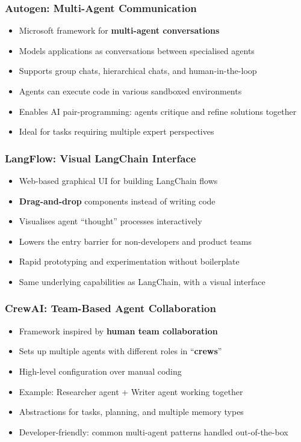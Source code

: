 \begin{frame}[fragile]\frametitle{Autogen: Multi-Agent Communication}
      \begin{itemize}
	  \item Microsoft framework for \textbf{multi-agent conversations}
	  \item Models applications as conversations between specialised agents
	  \item Supports group chats, hierarchical chats, and human-in-the-loop
	  \item Agents can execute code in various sandboxed environments
	  \item Enables AI pair-programming: agents critique and refine solutions together
	  \item Ideal for tasks requiring multiple expert perspectives
	  \end{itemize}
\end{frame}

\begin{frame}[fragile]\frametitle{LangFlow: Visual LangChain Interface}
      \begin{itemize}
	  \item Web-based graphical UI for building LangChain flows
	  \item \textbf{Drag-and-drop} components instead of writing code
	  \item Visualises agent ``thought'' processes interactively
	  \item Lowers the entry barrier for non-developers and product teams
	  \item Rapid prototyping and experimentation without boilerplate
	  \item Same underlying capabilities as LangChain, with a visual interface
	  \end{itemize}
\end{frame}

\begin{frame}[fragile]\frametitle{CrewAI: Team-Based Agent Collaboration}
      \begin{itemize}
	  \item Framework inspired by \textbf{human team collaboration}
	  \item Sets up multiple agents with different roles in ``\textbf{crews}''
	  \item High-level configuration over manual coding
	  \item Example: Researcher agent + Writer agent working together
	  \item Abstractions for tasks, planning, and multiple memory types
	  \item Developer-friendly: common multi-agent patterns handled out-of-the-box
	  \end{itemize}
\end{frame}

